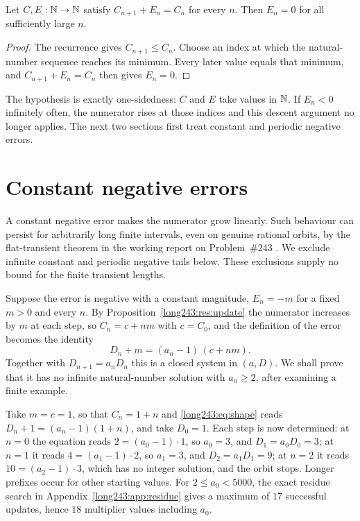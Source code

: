 \documentclass[11pt]{article}
\begin{document}
\begin{theorem}[descent]\label{long243:res:descent}
Let $C,E:\mathbb{N}\to\mathbb{N}$ satisfy $C_{n+1}+E_n=C_n$ for every $n$.  Then $E_n=0$ for
all sufficiently large $n$.
\end{theorem}

\begin{proof}
The recurrence gives $C_{n+1}\le C_n$. Choose an index at which the
natural-number sequence reaches its minimum. Every later value equals
that minimum, and $C_{n+1}+E_n=C_n$ then gives $E_n=0$.
\end{proof}



The hypothesis is exactly one-sidedness: $C$ and $E$ take values in $\mathbb{N}$.  If
$E_n<0$ infinitely often, the numerator rises at those indices and this
descent argument no longer applies. The next two sections first treat
constant and periodic negative errors.

\section{Constant negative errors}\label{long243:sec:constant}

A constant negative error makes the numerator grow linearly.
Such behaviour can persist for arbitrarily long finite intervals, even
on genuine rational orbits, by the flat-transient theorem in the working
report on Problem~\#243
\cite[``Flat-transient theorem'']{erdosproblemaday243}. We exclude
infinite constant and periodic negative tails below. These exclusions
supply no bound for the finite transient lengths.

Suppose the error is negative with a constant magnitude, $E_n=-m$ for a fixed
$m>0$ and every $n$.  By
Proposition~\ref{long243:res:update} the numerator increases by $m$ at each step,
so $C_n=c+nm$ with $c=C_0$, and the definition of the error becomes the
identity
\[
 D_n+m=(a_n-1)\,(c+nm) .
\tag{5.1}\label{long243:eq:shape}
\]
Together with $D_{n+1}=a_nD_n$ this is a closed system in $(a,D)$.
We shall prove that it has no infinite natural-number solution with
$a_n\ge2$, after examining a finite example.

\begin{example}\label{long243:ex:shape}
Take $m=c=1$, so that $C_n=1+n$ and \eqref{long243:eq:shape} reads
$D_n+1=(a_n-1)(1+n)$, and take $D_0=1$.  Each step is now determined: at $n=0$
the equation reads $2=(a_0-1)\cdot1$, so $a_0=3$, and $D_1=a_0D_0=3$; at $n=1$
it reads $4=(a_1-1)\cdot2$, so $a_1=3$, and $D_2=a_1D_1=9$; at $n=2$ it reads
$10=(a_2-1)\cdot3$, which has no integer solution, and the orbit stops.
Longer prefixes occur for other starting values. For $2\le a_0<5000$,
the exact residue search in Appendix~\ref{long243:app:residue} gives a
maximum of $17$ successful updates, hence $18$ multiplier values
including $a_0$.
\end{example}
\end{document}
